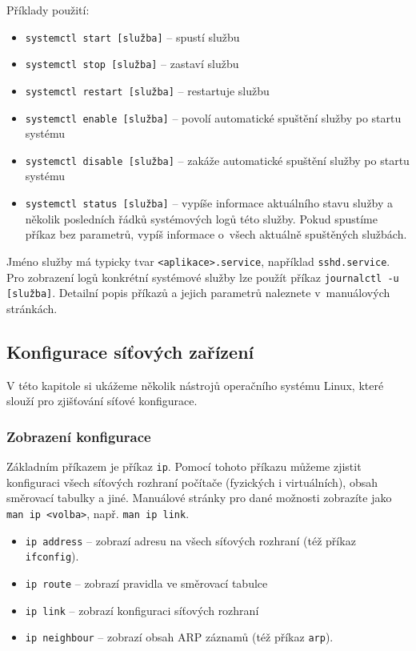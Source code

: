 Příklady použití: 
\begin{itemize}
  \item \texttt{systemctl start [služba]} -- spustí službu
  \item \texttt{systemctl stop [služba]} -- zastaví službu
  \item \texttt{systemctl restart [služba]} -- restartuje službu
  \item \texttt{systemctl enable [služba]} -- povolí automatické spuštění služby po startu systému
  \item \texttt{systemctl disable [služba]} -- zakáže automatické spuštění služby po startu systému
  \item \texttt{systemctl status [služba]} -- vypíše informace aktuálního stavu služby a několik posledních řádků systémových logů této služby. Pokud spustíme příkaz bez parametrů, vypíš  informace
        o~všech aktuálně spuštěných službách.
\end{itemize}

Jméno služby má typicky tvar \texttt{<aplikace>.service}, například
\texttt{sshd.service}. Pro zobrazení logů konkrétní systémové služby lze použít příkaz \texttt{journalctl -u [služba]}. Detailní popis příkazů a jejich parametrů naleznete v~manuálových stránkách.

\subsection{Konfigurace síťových zařízení} \label{basic_ipconfig}
V této kapitole si ukážeme několik nástrojů operačního systému Linux, které slouží pro zjišťování síťové konfigurace.

\subsubsection{Zobrazení konfigurace}
Základním příkazem je příkaz \texttt{ip}. Pomocí tohoto příkazu můžeme zjistit konfiguraci všech síťových rozhraní počítače (fyzických i virtuálních), obsah směrovací tabulky a jiné. Manuálové stránky pro dané možnosti zobrazíte jako \texttt{man ip <volba>}, např. {\tt man ip link}.

\begin{itemize}
  \item \texttt{ip address} -- zobrazí adresu na všech síťových rozhraní (též příkaz {\tt ifconfig}). 
  \item \texttt{ip route} -- zobrazí pravidla ve směrovací tabulce
  \item \texttt{ip link} -- zobrazí konfiguraci síťových rozhraní
  \item \texttt{ip neighbour} -- zobrazí obsah ARP záznamů (též příkaz \texttt{arp}).
\end{itemize}

